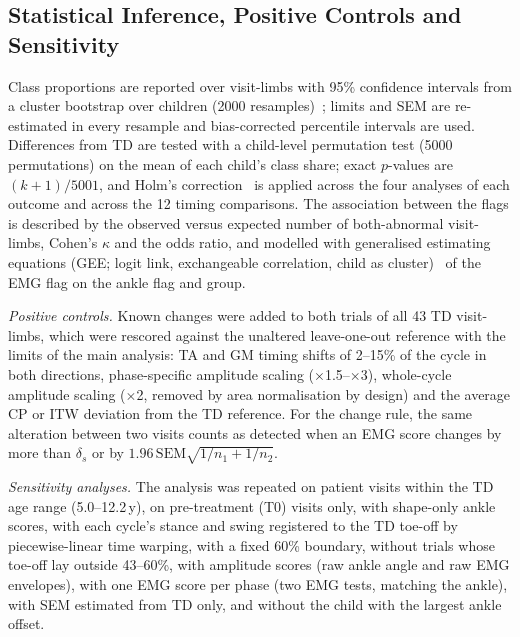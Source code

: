 \documentclass[conference]{IEEEtran}
\newcommand{\rtwo}[1]{{\color{rII}#1}}
\newcommand{\rfour}[1]{{\color{rIV}#1}}
\newcommand{\rtwo}[1]{#1}
\newcommand{\rfour}[1]{#1}
\begin{document}
\subsection{Statistical Inference, Positive Controls and Sensitivity}
\label{sec:stat}
Class proportions are reported over visit-limbs with 95\% confidence intervals from a cluster bootstrap over children (2000 resamples)~\cite{efron1993bootstrap}; \rtwo{limits and SEM are re-estimated in every resample and bias-corrected percentile intervals are used. Differences from TD are tested with a child-level permutation test (5000 permutations) on the mean of each child's class share; exact $p$-values are $(k+1)/5001$, and Holm's correction~\cite{holm1979} is applied across the four analyses of each outcome and across the 12 timing comparisons.} \rtwo{The association between the flags is described by the observed versus expected number of both-abnormal visit-limbs, Cohen's $\kappa$ and the odds ratio, and modelled with generalised estimating equations (GEE; logit link, exchangeable correlation, child as cluster)~\cite{liang1986gee} of the EMG flag on the ankle flag and group.}

\rtwo{\emph{Positive controls.} Known changes were added to both trials of all 43 TD visit-limbs, which were rescored against the unaltered leave-one-out reference with the limits of the main analysis: TA and GM timing shifts of 2--15\% of the cycle in both directions, phase-specific amplitude scaling ($\times$1.5--$\times$3), whole-cycle amplitude scaling ($\times$2, removed by area normalisation by design) and the average CP or ITW deviation from the TD reference. For the change rule, the same alteration between two visits counts as detected when an EMG score changes by more than $\delta_s$ or by $1.96\,\mathrm{SEM}\sqrt{1/n_1+1/n_2}$.}

\rtwo{\emph{Sensitivity analyses.} The analysis was repeated on patient visits within the TD age range (5.0--12.2\,y),} on pre-treatment (T0) visits only, with shape-only ankle scores, \rfour{with each cycle's stance and swing registered to the TD toe-off by piecewise-linear time warping,} \rtwo{with a fixed 60\% boundary, without trials whose toe-off lay outside 43--60\%, with amplitude scores (raw ankle angle and raw EMG envelopes), with one EMG score per phase (two EMG tests, matching the ankle), with SEM estimated from TD only, and without the child with the largest ankle offset.}
\end{document}
